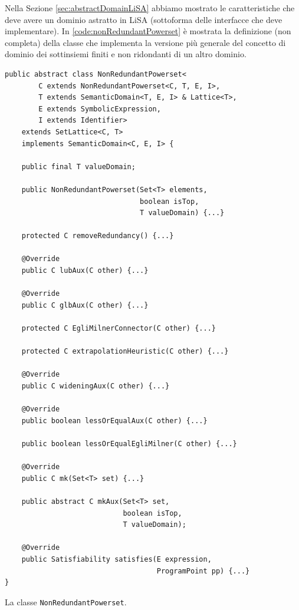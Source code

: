 Nella Sezione \ref{sec:abstractDomainLiSA} abbiamo mostrato le caratteristiche che deve avere un dominio astratto in LiSA (sottoforma delle interfacce che deve implementare). In \ref{code:nonRedundantPowerset} è mostrata la definizione (non completa) della classe che implementa la versione più generale del concetto di dominio dei sottinsiemi finiti e non ridondanti di un altro dominio.
\begin{algorithm}
\lstset{frame=none}
\begin{lstlisting}[belowskip=-1.1 \baselineskip]
public abstract class NonRedundantPowerset<
        C extends NonRedundantPowerset<C, T, E, I>,
        T extends SemanticDomain<T, E, I> & Lattice<T>,
        E extends SymbolicExpression,
        I extends Identifier> 
    extends SetLattice<C, T> 
    implements SemanticDomain<C, E, I> {

    public final T valueDomain;
    
    public NonRedundantPowerset(Set<T> elements, 
                                boolean isTop, 
                                T valueDomain) {...}
    
    protected C removeRedundancy() {...}
    
    @Override
    public C lubAux(C other) {...}
    
    @Override
    public C glbAux(C other) {...}
    
    protected C EgliMilnerConnector(C other) {...}
    
    protected C extrapolationHeuristic(C other) {...}
    
    @Override
    public C wideningAux(C other) {...}
    
    @Override
    public boolean lessOrEqualAux(C other) {...}
    
    public boolean lessOrEqualEgliMilner(C other) {...}
    
    @Override
    public C mk(Set<T> set) {...}
    
    public abstract C mkAux(Set<T> set, 
                            boolean isTop, 
                            T valueDomain);
    
    @Override
    public Satisfiability satisfies(E expression, 
                                    ProgramPoint pp) {...}
}
\end{lstlisting}
\caption{La classe \texttt{NonRedundantPowerset}.}
\label{code:nonRedundantPowerset}
\end{algorithm}
